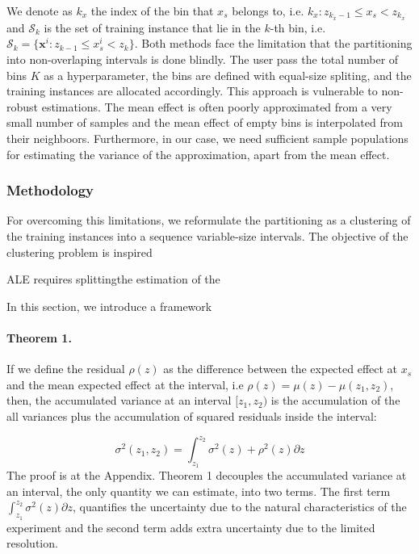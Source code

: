 \documentclass[twoside]{article}
\newcommand{\xb}{\mathbf{x}}
\begin{document}
We denote as \(k_x\) the index of the bin that \(x_s\) belongs to,
i.e. \(k_x: z_{k_x-1} \leq x_s < z_{k_x} \) and \(\mathcal{S}_k\) is
the set of training instance that lie in the \(k\)-th bin, i.e.
\( \mathcal{S}_k = \{ \xb^i : z_{k-1} \leq x^i_s < z_{k} \} \). Both
methods face the limitation that the partitioning into non-overlaping
intervals is done blindly. The user pass the total number of bins
\(K\) as a hyperparameter, the bins are defined with equal-size
spliting, and the training instances are allocated accordingly. This
approach is vulnerable to non-robust estimations. The mean effect is
often poorly approximated from a very small number of samples and the
mean effect of empty bins is interpolated from their
neighboors. Furthermore, in our case, we need sufficient sample
populations for estimating the variance of the approximation, apart
from the mean effect.

\subsubsection{Methodology}

For overcoming this limitations, we reformulate the partitioning as a
clustering of the training instances into a sequence variable-size
intervals. The objective of the clustering problem is inspired 


ALE requires splittingthe estimation of the 

In this section, we introduce a framework 

\paragraph{Theorem 1.} If we define the residual \(\rho(z)\) as the
difference between the expected effect at \(x_s\) and the mean
expected effect at the interval, i.e
\(\rho(z) = \mu(z) - \mu(z_1, z_2)\), then, the accumulated variance
at an interval \([z_1, z_2)\) is the accumulation of the all variances
plus the accumulation of squared residuals inside the interval:

\begin{equation}
 \sigma^2(z_1, z_2) = \int_{z_1}^{z_2} \sigma^2(z) + \rho^2(z) \partial z
\end{equation}
%
The proof is at the Appendix. Theorem 1 decouples the accumulated
variance at an interval, the only quantity we can estimate, into two
terms. The first term \(\int_{z_1}^{z_2} \sigma^2(z) \partial z\),
quantifies the uncertainty due to the natural characteristics of the
experiment and the second term adds extra uncertainty due to the
limited resolution.
\end{document}
